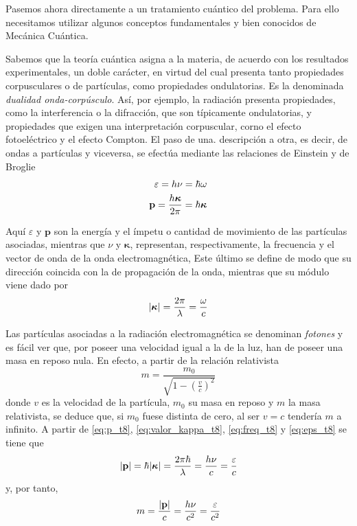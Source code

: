 Pasemos ahora directamente a un tratamiento cuántico del problema.
Para ello necesitamos utilizar algunos conceptos fundamentales y bien conocidos de Mecánica Cuántica.

Sabemos que la teoría cuántica asigna a la materia, de acuerdo con los resultados experimentales, un doble carácter, en virtud del cual presenta tanto propiedades corpusculares o de partículas, como propiedades ondulatorias.
Es la denominada \emph{dualidad onda-corpúsculo}.
Así, por ejemplo, la radiación presenta propiedades, como la interferencia o la difracción, que son típicamente ondulatorias, y propiedades que exigen una interpretación corpuscular, corno el efecto fotoeléctrico y el efecto Compton.
El paso de una. descripción a otra, es decir, de ondas a partículas y viceversa, se efectúa mediante las relaciones de Einstein y de Broglie
\begin{align}
	\varepsilon = h\nu = \hbar\omega \label{eq:eps_t8}\\
	\vb{p} = \frac{h\bm{\kappa}}{2\pi} = \hbar\bm{\kappa} \label{eq:p_t8}
\end{align}

Aquí $\varepsilon$ y $\mathbf{p}$ son la energía y el ímpetu o cantidad de movimiento de las partículas asociadas, mientras que $\nu$ y $\bm{\kappa}$, representan, respectivamente, la frecuencia y el vector de onda de la onda electromagnética, Este último se define de modo que su dirección coincida con la de propagación de la onda, mientras que su módulo viene dado por
\begin{equation}\label{eq:valor_kappa_t8}
	\abs{\bm{\kappa}} = \frac{2\pi}{\lambda} = \frac{\omega}{c}
\end{equation}

Las partículas asociadas a la radiación electromagnética se denominan \emph{fotones} y es fácil ver que, por poseer una velocidad igual a la de la luz, han de poseer una masa en reposo nula.
En efecto, a partir de la relación relativista
\begin{equation}
	m = \frac{m_0}{\sqrt{1 - \left(\frac{v}{c}\right)^2}}
\end{equation}
donde $v$ es la velocidad de la partícula, $m_0$ su masa en reposo y $m$ la masa relativista, se deduce que, si $m_0$ fuese distinta de cero, al ser $v = c$ tendería $m$ a infinito.
A partir de \eqref{eq:p_t8}, \eqref{eq:valor_kappa_t8}, \eqref{eq:freq_t8} y \eqref{eq:eps_t8} se tiene que
\begin{equation}
	\abs{\vb{p}} = \hbar \abs{\bm{\kappa}} = \frac{2\pi \hbar}{\lambda} = \frac{h\nu}{c} = \frac{\varepsilon}{c}
\end{equation}
y, por tanto,
\begin{equation}
	m = \frac{\abs{\vb{p}}}{c} = \frac{h\nu}{c^2} = \frac{\varepsilon}{c^2}
\end{equation}

